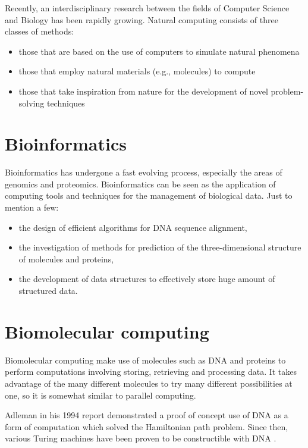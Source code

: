 Recently, an interdisciplinary research between the fields of Computer Science and Biology has been rapidly growing. Natural computing consists of three classes of methods:
\begin{itemize}
  \item those that are based on the use of computers to simulate natural phenomena
  \item those that employ natural materials (e.g., molecules) to compute
  \item those that take inspiration from nature for the development of novel problem-solving techniques
\end{itemize}


\section{Bioinformatics} %
\label{sec:bioinformatics}

Bioinformatics has undergone a fast evolving process, especially the areas of genomics and proteomics. Bioinformatics can be seen as the application of computing tools and techniques for the management of biological data. Just to mention a few:
\begin{itemize} 
  \item the design of efficient algorithms for DNA sequence alignment,
  \item the investigation of methods for prediction of the three-dimensional structure of molecules and proteins,
  \item the development of data structures to effectively store huge amount of structured data.
\end{itemize}


\section{Biomolecular computing} %
\label{sec:biomolecular_computing}

Biomolecular computing make use of molecules such as DNA and proteins to perform computations involving storing, retrieving and processing data. It takes advantage of the many different molecules to try many different possibilities at one, so it is somewhat similar to parallel computing.

Adleman in his 1994 report \cite{Adleman1994MolecularComputation} demonstrated a proof of concept use of DNA as a form of computation which solved the Hamiltonian path problem. Since then, various Turing machines have been proven to be constructible with DNA \cite{Kari2000DNAPCP}. 

